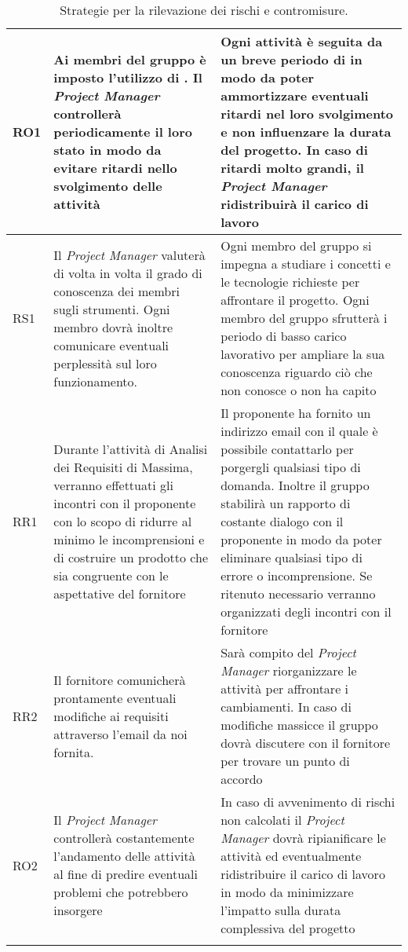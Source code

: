 \begin{longtable}[H]{|l|P{6cm}|P{8cm}|}
		\hline
		RO1     & Ai membri del gruppo è imposto l'utilizzo di . Il \emph{Project Manager} controllerà periodicamente il loro stato in modo da evitare ritardi nello svolgimento delle attività & Ogni attività è seguita da un breve periodo di  in modo da poter ammortizzare eventuali ritardi nel loro svolgimento e non influenzare la durata del progetto. In caso di ritardi molto grandi, il \emph{Project Manager} ridistribuirà il carico di lavoro\\  
		\hline
		RS1     & Il \emph{Project Manager} valuterà di volta in volta il grado di conoscenza dei membri sugli strumenti. Ogni membro dovrà inoltre comunicare eventuali perplessità sul loro funzionamento. & Ogni membro del gruppo si impegna a studiare i concetti e le tecnologie richieste per affrontare il progetto. Ogni membro del gruppo sfrutterà i periodo di basso carico lavorativo per ampliare la sua conoscenza riguardo ciò che non conosce o non ha capito\\
		\hline
		RR1     & Durante l'attività di Analisi dei Requisiti di Massima, verranno effettuati gli incontri con il proponente con lo scopo di ridurre al minimo le incomprensioni e di costruire un prodotto che sia congruente con le aspettative del fornitore  & Il proponente ha fornito un indirizzo email con il quale è possibile contattarlo per porgergli qualsiasi tipo di domanda. Inoltre il gruppo stabilirà un rapporto di costante dialogo con il proponente in modo da poter eliminare qualsiasi tipo di errore o incomprensione. Se ritenuto necessario verranno organizzati degli incontri con il fornitore\\
		\hline
		RR2 & Il fornitore comunicherà prontamente eventuali modifiche ai requisiti attraverso l'email da noi fornita. & Sarà compito del \emph{Project Manager} riorganizzare le attività per affrontare i cambiamenti. In caso di modifiche massicce il gruppo dovrà discutere con il fornitore per trovare un punto di accordo\\
		\hline                                                                                                                           
		RO2 & Il \emph{Project Manager} controllerà costantemente l'andamento delle attività al fine di predire eventuali problemi che potrebbero insorgere & In caso di avvenimento di rischi non calcolati il \emph{Project Manager} dovrà ripianificare le attività ed eventualmente ridistribuire il carico di lavoro in modo da minimizzare l'impatto sulla durata complessiva del progetto\\
		\hline
		\caption{Strategie per la rilevazione dei rischi e contromisure.}
\end{longtable}





